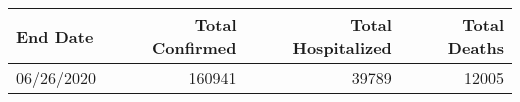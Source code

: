 \begin{tabular}{lrrr}
\toprule
   End Date &  Total Confirmed &  Total Hospitalized &  Total Deaths \\
\midrule
 06/26/2020 &           160941 &               39789 &         12005 \\
\bottomrule
\end{tabular}
